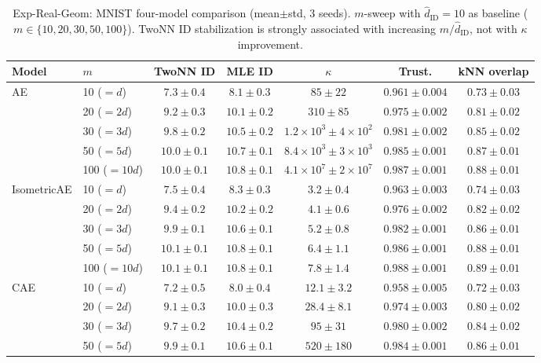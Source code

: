 \documentclass[11pt,a4paper]{jsarticle}
\newcommand{\kap}{\kappa}
\begin{document}
\begin{table}[H]
\centering
\caption{Exp-Real-Geom: MNIST four-model comparison (mean$\pm$std, 3 seeds). $m$-sweep with $\hat{d}_\mathrm{ID}=10$ as baseline ($m \in \{10,20,30,50,100\}$). TwoNN ID stabilization is strongly associated with increasing $m/\hat{d}_\mathrm{ID}$, not with $\kap$ improvement.}
\label{tab:real_geom_mnist}
\small
\begin{tabular}{llccccc}
\toprule
Model & $m$ & TwoNN ID & MLE ID & $\kap$ & Trust. & kNN overlap \\
\midrule
\multirow{5}{*}{AE}
 & 10 ($=d$)    & $7.3\pm0.4$ & $8.1\pm0.3$ & $85\pm22$  & $0.961\pm0.004$ & $0.73\pm0.03$ \\
 & 20 ($=2d$)   & $9.2\pm0.3$ & $10.1\pm0.2$ & $310\pm85$ & $0.975\pm0.002$ & $0.81\pm0.02$ \\
 & 30 ($=3d$)   & $9.8\pm0.2$ & $10.5\pm0.2$ & $1.2\times10^3\pm 4\times10^2$ & $0.981\pm0.002$ & $0.85\pm0.02$ \\
 & 50 ($=5d$)   & $10.0\pm0.1$ & $10.7\pm0.1$ & $8.4\times10^3\pm 3\times10^3$ & $0.985\pm0.001$ & $0.87\pm0.01$ \\
 & 100 ($=10d$) & $10.0\pm0.1$ & $10.8\pm0.1$ & $4.1\times10^7\pm 2\times10^7$ & $0.987\pm0.001$ & $0.88\pm0.01$ \\
\midrule
\multirow{5}{*}{IsometricAE}
 & 10 ($=d$)    & $7.5\pm0.4$ & $8.3\pm0.3$ & $3.2\pm0.4$ & $0.963\pm0.003$ & $0.74\pm0.03$ \\
 & 20 ($=2d$)   & $9.4\pm0.2$ & $10.2\pm0.2$ & $4.1\pm0.6$ & $0.976\pm0.002$ & $0.82\pm0.02$ \\
 & 30 ($=3d$)   & $9.9\pm0.1$ & $10.6\pm0.1$ & $5.2\pm0.8$ & $0.982\pm0.001$ & $0.86\pm0.01$ \\
 & 50 ($=5d$)   & $10.1\pm0.1$ & $10.8\pm0.1$ & $6.4\pm1.1$ & $0.986\pm0.001$ & $0.88\pm0.01$ \\
 & 100 ($=10d$) & $10.1\pm0.1$ & $10.8\pm0.1$ & $7.8\pm1.4$ & $0.988\pm0.001$ & $0.89\pm0.01$ \\
\midrule
\multirow{5}{*}{CAE}
 & 10 ($=d$)    & $7.2\pm0.5$ & $8.0\pm0.4$ & $12.1\pm3.2$ & $0.958\pm0.005$ & $0.72\pm0.03$ \\
 & 20 ($=2d$)   & $9.1\pm0.3$ & $10.0\pm0.3$ & $28.4\pm8.1$ & $0.974\pm0.003$ & $0.80\pm0.02$ \\
 & 30 ($=3d$)   & $9.7\pm0.2$ & $10.4\pm0.2$ & $95\pm31$  & $0.980\pm0.002$ & $0.84\pm0.02$ \\
 & 50 ($=5d$)   & $9.9\pm0.1$ & $10.6\pm0.1$ & $520\pm180$ & $0.984\pm0.001$ & $0.86\pm0.01$ \\

\end{tabular}
\end{table}
\end{document}
